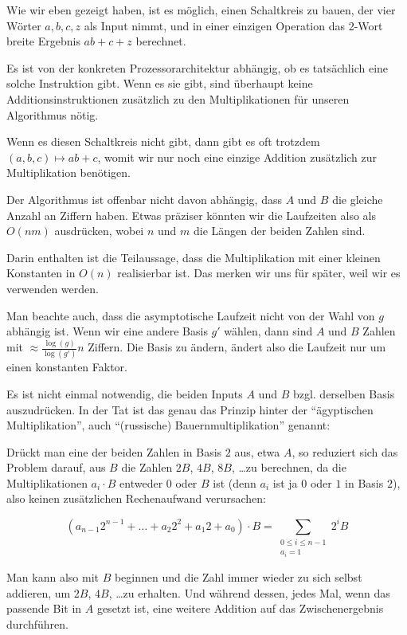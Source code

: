 \begin{remark}
    Wie wir eben gezeigt haben, ist es möglich, einen Schaltkreis zu bauen, der vier Wörter $a,b,c,z$ als Input nimmt, und in einer einzigen Operation das 2-Wort breite Ergebnis $ab+c+z$ berechnet.

    \smallskip
    Es ist von der konkreten Prozessorarchitektur abhängig, ob es tatsächlich eine solche Instruktion gibt. Wenn es sie gibt, sind überhaupt keine Additionsinstruktionen zusätzlich zu den Multiplikationen für unseren Algorithmus nötig.

    \smallskip
    Wenn es diesen Schaltkreis nicht gibt, dann gibt es oft trotzdem $(a,b,c)\mapsto ab+c$, womit wir nur noch eine einzige Addition zusätzlich zur Multiplikation benötigen.
\end{remark}

\begin{remark}
    Der Algorithmus ist offenbar nicht davon abhängig, dass $A$ und $B$ die gleiche Anzahl an Ziffern haben. Etwas präziser könnten wir die Laufzeiten also als $O(nm)$ ausdrücken, wobei $n$ und $m$ die Längen der beiden Zahlen sind.

    \smallskip
    Darin enthalten ist die Teilaussage, dass die Multiplikation mit einer kleinen Konstanten in $O(n)$ realisierbar ist. Das merken wir uns für später, weil wir es verwenden werden.
\end{remark}

\begin{remark}
    Man beachte auch, dass die asymptotische Laufzeit nicht von der Wahl von $g$ abhängig ist. Wenn wir eine andere Basis $g'$ wählen, dann sind $A$ und $B$ Zahlen mit $\approx \frac{\log(g)}{\log(g')}n$ Ziffern. Die Basis zu ändern, ändert also die Laufzeit nur um einen konstanten Faktor.
\end{remark}


\begin{remark}
    Es ist nicht einmal notwendig, die beiden Inputs $A$ und $B$ bzgl. derselben Basis auszudrücken. In der Tat ist das genau das Prinzip hinter der \enquote{ägyptischen Multiplikation}, auch \enquote{(russische) Bauernmultiplikation} genannt:

    Drückt man eine der beiden Zahlen in Basis $2$ aus, etwa $A$, so reduziert sich das Problem darauf, aus $B$ die Zahlen $2B$, $4B$, $8B$, \ldots zu berechnen, da die Multiplikationen $a_i\cdot B$ entweder $0$ oder $B$ ist (denn $a_i$ ist ja $0$ oder $1$ in Basis $2$), also keinen zusätzlichen Rechenaufwand verursachen:

    \[(a_{n-1} 2^{n-1} + \ldots + a_2 2^2 + a_1 2 + a_0) \cdot B = \sum_{\substack{0\leq i\leq n-1 \\ a_i = 1}} 2^i B\]

    Man kann also mit $B$ beginnen und die Zahl immer wieder zu sich selbst addieren, um $2B$, $4B$, \ldots zu erhalten. Und während dessen, jedes Mal, wenn das passende Bit in $A$ gesetzt ist, eine weitere Addition auf das Zwischenergebnis durchführen.
\end{remark}

